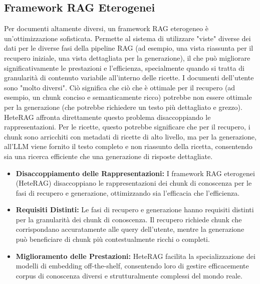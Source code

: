 \documentclass[a4paper, 11pt]{article}
\begin{document}
\subsection{Framework RAG Eterogenei}
Per documenti altamente diversi, un framework RAG eterogeneo è un'ottimizzazione sofisticata. Permette al sistema di utilizzare "viste" diverse dei dati per le diverse fasi della pipeline RAG (ad esempio, una vista riassunta per il recupero iniziale, una vista dettagliata per la generazione), il che può migliorare significativamente le prestazioni e l'efficienza, specialmente quando si tratta di granularità di contenuto variabile all'interno delle ricette. I documenti dell'utente sono "molto diversi". Ciò significa che ciò che è ottimale per il recupero (ad esempio, un chunk conciso e semanticamente ricco) potrebbe non essere ottimale per la generazione (che potrebbe richiedere un testo più dettagliato e grezzo). HeteRAG \cite{heterag} affronta direttamente questo problema disaccoppiando le rappresentazioni. Per le ricette, questo potrebbe significare che per il recupero, i chunk sono arricchiti con metadati di ricette di alto livello, ma per la generazione, all'LLM viene fornito il testo completo e non riassunto della ricetta, consentendo sia una ricerca efficiente che una generazione di risposte dettagliate.
\begin{itemize}
    \item \textbf{Disaccoppiamento delle Rappresentazioni:} I framework RAG eterogenei (HeteRAG) disaccoppiano le rappresentazioni dei chunk di conoscenza per le fasi di recupero e generazione, ottimizzando sia l'efficacia che l'efficienza. \cite{heterag}
    \item \textbf{Requisiti Distinti:} Le fasi di recupero e generazione hanno requisiti distinti per la granularità dei chunk di conoscenza. Il recupero richiede chunk che corrispondano accuratamente alle query dell'utente, mentre la generazione può beneficiare di chunk più contestualmente ricchi o completi. \cite{heterag}
    \item \textbf{Miglioramento delle Prestazioni:} HeteRAG facilita la specializzazione dei modelli di embedding off-the-shelf, consentendo loro di gestire efficacemente corpus di conoscenza diversi e strutturalmente complessi del mondo reale. \cite{heterag}
\end{itemize}
\end{document}
